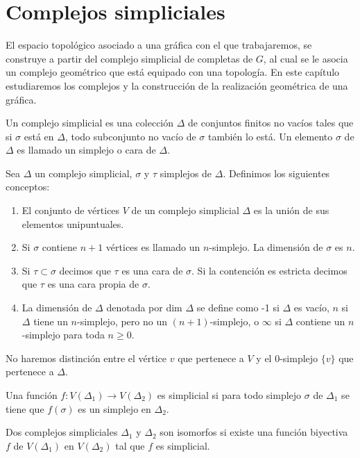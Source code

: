\chapter{Complejos simpliciales}
El espacio topológico asociado a una gráfica con el que trabajaremos, se construye a partir del complejo simplicial de completas de $G$, al cual se le asocia un complejo geométrico que está equipado con una topología. En este capítulo estudiaremos los complejos y la construcción de la realización geométrica de una gráfica.

\begin{Defi}
Un complejo simplicial es una colección $\Delta$ de conjuntos finitos no vacíos tales que si $\sigma$ está en $\Delta$, todo subconjunto no vacío de $\sigma$ también lo está. Un elemento $\sigma$ de $\Delta$ es llamado un simplejo o cara de $\Delta$. 
\end{Defi}

\begin{Defi}
Sea $\Delta$ un complejo simplicial, $\sigma$ y $\tau$ simplejos de $\Delta$. Definimos los siguientes conceptos:
\begin{enumerate}
\item El conjunto de vértices $V$ de un complejo simplicial $\Delta$ es la unión de sus elementos unipuntuales.
\item Si $\sigma$ contiene $n + 1$ vértices es llamado un $n$-simplejo. La dimensión de $\sigma$ es $n$.
\item Si $\tau\subset\sigma$ decimos que $\tau$ es una cara de $\sigma$. Si la contención es estricta decimos que $\tau$ es una cara propia de $\sigma$.
\item La dimensión de $\Delta$ denotada por dim $\Delta$ se define como -1 si $\Delta$ es vacío, $n$ si $\Delta$ tiene un $n$-simplejo, pero no un $(n+1)$-simplejo, o $\infty$ si $\Delta$ contiene un $n$-simplejo para toda $n\geqslant 0$.
\end{enumerate}
\end{Defi}
No haremos distinción entre el vértice $v$ que pertenece a $V$ y el 0-simplejo $\{v\}$ que pertenece a $\Delta$.
\begin{Defi}
Una función $f\colon V(\Delta_1)\rightarrow V(\Delta_2)$ es simplicial si para todo simplejo $\sigma$ de $\Delta_1$ se tiene que $f(\sigma)$ es un simplejo en $\Delta_2$.
\end{Defi}
\begin{Defi}
Dos complejos simpliciales $\Delta_1$ y $\Delta_2$ son isomorfos si existe una función biyectiva $f$ de $V(\Delta_1)$ en $V(\Delta_2)$ tal que $f$ es simplicial.
\end{Defi}

